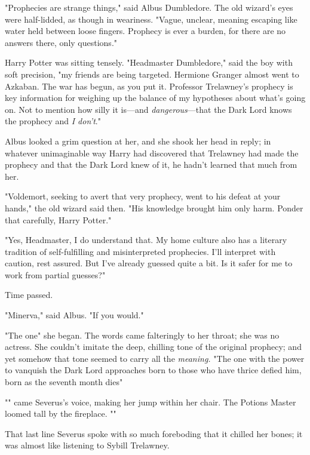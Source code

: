 "Prophecies are strange things," said Albus Dumbledore. The old wizard's eyes
were half-lidded, as though in weariness. "Vague, unclear, meaning escaping
like water held between loose fingers. Prophecy is ever a burden, for there are
no answers there, only questions."

Harry Potter was sitting tensely. "Headmaster Dumbledore," said the boy with
soft precision, "my friends are being targeted. Hermione Granger almost went to
Azkaban. The war has begun, as you put it. Professor Trelawney's prophecy is
key information for weighing up the balance of my hypotheses about what's going
on. Not to mention how silly it is---and \emph{dangerous}---that the Dark Lord
knows the prophecy and \emph{I don't}."

Albus looked a grim question at her, and she shook her head in reply; in
whatever unimaginable way Harry had discovered that Trelawney had made the
prophecy and that the Dark Lord knew of it, he hadn't learned that much from
her.

"Voldemort, seeking to avert that very prophecy, went to his defeat at your
hands," the old wizard said then. "His knowledge brought him only harm. Ponder
that carefully, Harry Potter."

"Yes, Headmaster, I do understand that. My home culture also has a literary
tradition of self-fulfilling and misinterpreted prophecies. I'll interpret with
caution, rest assured. But I've already guessed quite a bit. Is it safer for me
to work from partial guesses?"

Time passed.

"Minerva," said Albus. "If you would."

"The one{\el}" she began. The words came falteringly to her throat; she was
no actress. She couldn't imitate the deep, chilling tone of the original
prophecy; and yet somehow that tone seemed to carry all the \emph{meaning.}
"The one with the power to vanquish the Dark Lord approaches{\el} born to
those who have thrice defied him, born as the seventh month dies{\el}"

"" came Severus's voice,
making her jump within her chair. The Potions Master loomed tall by the
fireplace. ""

That last line Severus spoke with so much foreboding that it chilled her bones;
it was almost like listening to Sybill Trelawney.

